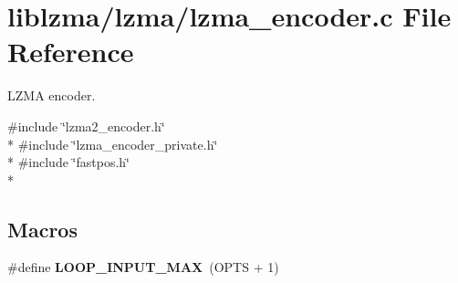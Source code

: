 \section{liblzma/lzma/lzma\-\_\-encoder.c File Reference}
\label{lzma__encoder_8c}


L\-Z\-M\-A encoder.  


{\ttfamily \#include \char`\"{}lzma2\-\_\-encoder.\-h\char`\"{}}\\*
{\ttfamily \#include \char`\"{}lzma\-\_\-encoder\-\_\-private.\-h\char`\"{}}\\*
{\ttfamily \#include \char`\"{}fastpos.\-h\char`\"{}}\\*
\subsection*{Macros}
\begin{DoxyCompactItemize}
\item 
\#define {\bf L\-O\-O\-P\-\_\-\-I\-N\-P\-U\-T\-\_\-\-M\-A\-X}~(O\-P\-T\-S + 1)
\end{DoxyCompactItemize}
